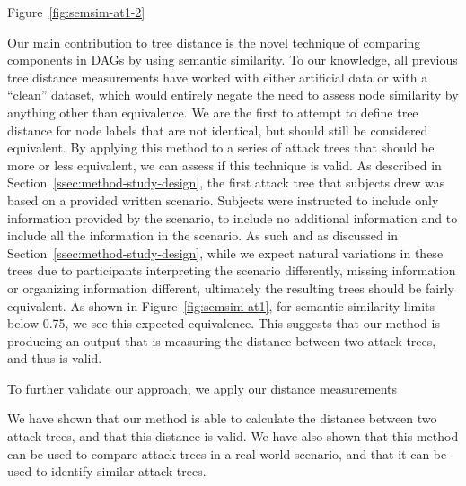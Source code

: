 Figure~\ref{fig:semsim-at1-2}

Our main contribution to tree distance is the novel technique of comparing components in DAGs by using semantic similarity. To our knowledge, all previous tree distance measurements have worked with either artificial data or with a ``clean'' dataset, which would entirely negate the need to assess node similarity by anything other than equivalence. We are the first to attempt to define tree distance for node labels that are not identical, but should still be considered equivalent. By applying this method to a series of attack trees that should be more or less equivalent, we can assess if this technique is valid. As described in Section~\ref{ssec:method-study-design}, the first attack tree that subjects drew was based on a provided written scenario. Subjects were instructed to include only information provided by the scenario, to include no additional information and to include all the information in the scenario. As such and as discussed in Section~\ref{ssec:method-study-design}, while we expect natural variations in these trees due to participants interpreting the scenario differently, missing information or organizing information different, ultimately the resulting trees should be fairly equivalent. As shown in Figure~\ref{fig:semsim-at1}, for semantic similarity limits  below 0.75, we see this expected equivalence. This suggests that our method is producing an output that is measuring the distance between two attack trees, and thus is valid.

To further validate our approach, we apply our distance measurements



We have shown that our method is able to calculate the distance between two attack trees, and that this distance is valid. We have also shown that this method can be used to compare attack trees in a real-world scenario, and that it can be used to identify similar attack trees.
 







